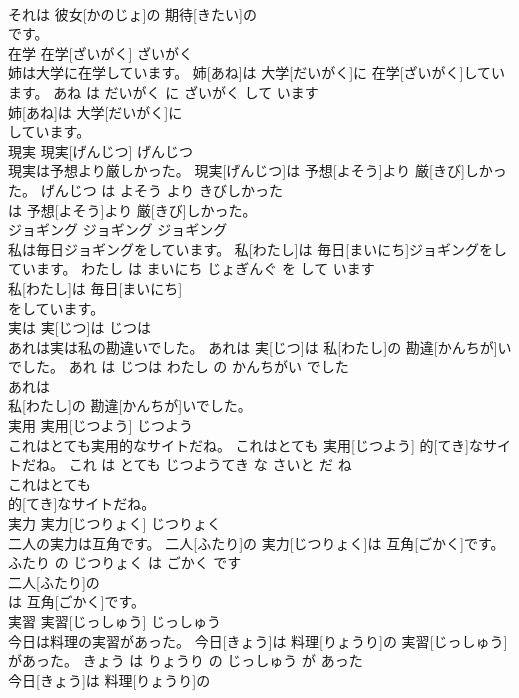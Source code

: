 \documentclass[8pt]{extreport}
\begin{document}
\begin{CJK}{UTF8}{min}
\\	それは 彼女[かのじょ]の 期待[きたい]の
\\	です。			
\\	在学	在学[ざいがく]	ざいがく	
\\	姉は大学に在学しています。	姉[あね]は 大学[だいがく]に 在学[ざいがく]しています。	あね は だいがく に ざいがく して います	
\\	姉[あね]は 大学[だいがく]に
\\	しています。			
\\	現実	現実[げんじつ]	げんじつ	
\\	現実は予想より厳しかった。	現実[げんじつ]は 予想[よそう]より 厳[きび]しかった。	げんじつ は よそう より きびしかった	
\\	は 予想[よそう]より 厳[きび]しかった。			
\\	ジョギング	ジョギング	ジョギング	
\\	私は毎日ジョギングをしています。	私[わたし]は 毎日[まいにち]ジョギングをしています。	わたし は まいにち じょぎんぐ を して います	
\\	私[わたし]は 毎日[まいにち]
\\	をしています。			
\\	実は	実[じつ]は	じつは	
\\	あれは実は私の勘違いでした。	あれは 実[じつ]は 私[わたし]の 勘違[かんちが]いでした。	あれ は じつは わたし の かんちがい でした	
\\	あれは
\\	私[わたし]の 勘違[かんちが]いでした。			
\\	実用	実用[じつよう]	じつよう	
\\	これはとても実用的なサイトだね。	これはとても 実用[じつよう] 的[てき]なサイトだね。	これ は とても じつようてき な さいと だ ね	
\\	これはとても
\\	的[てき]なサイトだね。			
\\	実力	実力[じつりょく]	じつりょく	
\\	二人の実力は互角です。	二人[ふたり]の 実力[じつりょく]は 互角[ごかく]です。	ふたり の じつりょく は ごかく です	
\\	二人[ふたり]の
\\	は 互角[ごかく]です。			
\\	実習	実習[じっしゅう]	じっしゅう	
\\	今日は料理の実習があった。	今日[きょう]は 料理[りょうり]の 実習[じっしゅう]があった。	きょう は りょうり の じっしゅう が あった	
\\	今日[きょう]は 料理[りょうり]の

\end{CJK}
\end{document}
